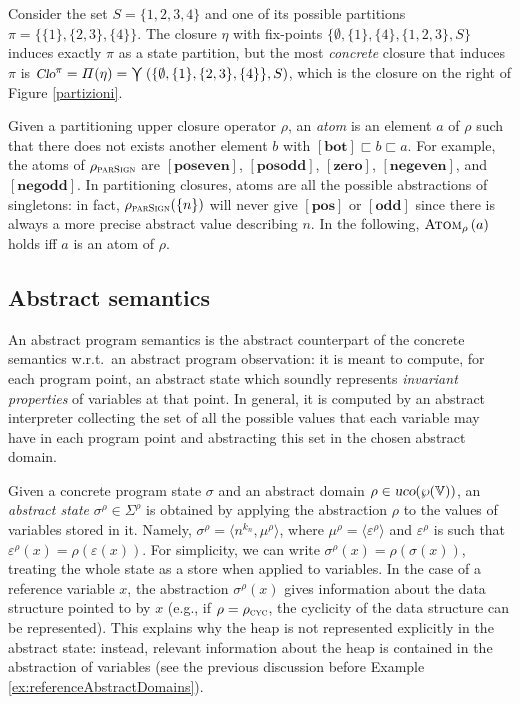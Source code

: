 \documentclass[prodmode,acmtocl]{acmsmall}
\def\state{\ensuremath{\sigma}\xspace}
\def\values{\ensuremath{\mathbb{V}}\xspace}
\def\abmemory{\ensuremath{\mu^\rho}\xspace}
\def\store{\ensuremath{\varepsilon}\xspace}
\def\astore{\ensuremath{\varepsilon^\rho}\xspace}
\def\uco{\ensuremath{\rho}\xspace}
\def\ucos{\ensuremath{\mbox{\sl uco}}\xspace}
\def\astate{{\sigma^\rho}\xspace}
\def\astates{{\Sigma^\rho}\xspace}
\newcommand*{\disj}[1]   {{\bigcurlyvee_{}^{}\left(#1\right)}}
\def\tuple#1{\langle #1 \rangle}
\newcommand{\0}{\mbox{\bf 0}}
\newcommand{\clor}[1]{\mbox{\sl\small Clo}^{#1}}
\def\ODD{\ABSVAL{odd}}
\def\BOT{\ABSVAL{bot}}
\def\POS{\ABSVAL{pos}}
\def\ZERO{\ABSVAL{zero}}
\def\PARSIGNDOM{\ensuremath{\uco_{\textsc{parSign}}}\xspace}
\def\POSEVEN{\ABSVAL{poseven}}
\def\POSODD{\ABSVAL{posodd}}
\def\NEGEVEN{\ABSVAL{negeven}}
\def\NEGODD{\ABSVAL{negodd}}
\def\CYCLEDOM{\ensuremath{\uco_{\textsc{cyc}}}\xspace}
\newcommand{\ABSVAL}[1]{\left[\mathbf{#1}\right]}
\newcommand{\ISATOM}[2]{\textsc{Atom}_{#2}\left(#1\right)}
\begin{document}
\begin{example}  
  Consider the set $S=\{1,2,3,4\}$ and one of its possible partitions
  $\pi=\{\{1\},\{2,3\},\{4\}\}$.  The closure $\eta$ with fix-points
  $\{\emptyset,\{1\},\{4\},\{1,2,3\},S\}$ induces exactly $\pi$ as a
  state partition, but the most \emph{concrete} closure that induces
  $\pi$ is
  $\clor{\pi}=\Pi(\eta)=\disj{\{\emptyset,\{1\},\{2,3\},\{4\}\},S}$,
  which is the closure on the right of Figure \ref{partizioni}.
\end{example}

Given a partitioning upper closure operator $\uco$, an \emph{atom} is
an element $a$ of $\uco$ such that there does not exists another
element $b$ with $\BOT \sqsubset b \sqsubset a$.  For example, the
atoms of $\PARSIGNDOM$ are $\POSEVEN$, $\POSODD$, $\ZERO$, $\NEGEVEN$,
and $\NEGODD$.  In partitioning closures, atoms are all the possible
abstractions of singletons: in fact, $\PARSIGNDOM(\{n\})$ will never
give $\POS$ or $\ODD$ since there is always a more precise abstract
value describing $n$.  In the following, $\ISATOM{a}{\uco}$ holds iff
$a$ is an atom of $\uco$.

\subsection{Abstract semantics}
\label{sec:abstractSemantics}

An abstract program semantics is the abstract counterpart of the
concrete semantics w.r.t.\ an abstract program observation: it is
meant to compute, for each program point, an abstract state which
soundly represents \emph{invariant properties} of variables at that
point.  In general, it is computed by an abstract interpreter
\cite{CC79} collecting the set of all the possible values that each
variable may have in each program point and abstracting this set in
the chosen abstract domain.

Given a concrete program state $\state$ and an abstract domain
$\uco\in\ucos(\wp(\values))$, an \emph{abstract state}
$\astate\in\astates$ is obtained by applying the abstraction $\uco$ to
the values of variables stored in it.
Namely, $\astate=\tuple{n^{k_n},\abmemory}$, where
$\abmemory=\tuple{\astore}$ and $\astore$ is such that
$\astore(x)=\uco(\store(x))$.  For simplicity, we can write
$\astate(x)=\uco(\state(x))$, treating the whole state as a store when
applied to variables.  In the case of a reference variable $x$, the
abstraction $\astate(x)$ gives information about the data structure
pointed to by $x$ (e.g., if $\uco = \CYCLEDOM$, the cyclicity of the
data structure can be represented).  This explains why the heap is not
represented explicitly in the abstract state: instead, relevant
information about the heap is contained in the abstraction of
variables (see the previous discussion before Example
\ref{ex:referenceAbstractDomains}).
\end{document}
